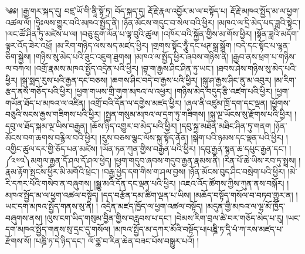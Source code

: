 ༄༅། །རྒྱ་གར་སྐད་དུ། བཛྲ་ཡོ་གི་ནཱི་སྟོ་ཏྲ། བོད་སྐད་དུ། རྡོ་རྗེ་རྣལ་འབྱོར་མ་ལ་བསྟོད་པ། རྡོ་རྗེ་མཁའ་སྤྱོད་མ་ལ་ཕྱག་འཚལ་ལོ། །ཧྲཱིཿལས་གྱུར་བའི་མཁའ་སྤྱོད་ནི། །ཉོན་མོངས་གདུང་བ་སེལ་བའི་ཕྱིར། །མཁའ་ལ་དྲི་མེད་པད་ཟླའི་སྟེང་། །ལང་ཚོ་ཤིན་ཏུ་མཛེས་པ་ལ། །བཅུ་དྲུག་ལོན་པ་ལྟ་བུའི་ཚུལ། །འཁོར་བའི་སྐྱོན་གྱིས་མ་གོས་ཕྱིར། །སྟོན་ཟླའི་མདོག་ལྟར་འོད་ཟེར་འཕྲོ། །མ་རིག་གཉིད་ལས་སད་མཛད་ཕྱིར། །གྲགས་སྟོང་ཧཱུྃ་དང་ཕཊ་སྒྲ་སྒྲོག །བདེ་དང་སྟོང་པ་ལྷན་ཅིག་སྐྱེས། །གཉིས་སུ་མེད་པའི་ཟུང་འཇུག་ཐུགས། །མཁའ་ལ་སྤྱོད་ཕྱིར་ཞབས་གཉིས་ནི། །རྒྱབ་ནས་ཕྲག་པ་གཉིས་ལ་བཀལ། །འགྲོ་རྣམས་མཁའ་སྤྱོད་འདྲེན་པའི་ཕྱིར། །བྷ་ག་རྒྱས་ཤིང་ཤིན་ཏུ་ཡང་། །ཐབས་ཤེས་གཉིས་སུ་མེད་པའི་ཕྱིར། །སྐུ་སྨད་རུས་པའི་རྒྱན་དང་བཅས། །ཆགས་ཤིང་བདེ་བ་རྒྱས་པའི་ཕྱིར། །སྐུ་ཤ་རྒྱས་ཤིང་ནུ་མ་འབུར། །མ་རིག་རྩད་ནས་གཅོད་པའི་ཕྱིར། །ཕྱག་གཡས་གྲི་གུག་མཁའ་ལ་འཕྱར། །གཉིས་མེད་བདུད་རྩི་འཛག་པའི་ཕྱིར། །ཕྱག་གཡོན་ཐོད་པ་མཁའ་ལ་འཛིན། །འགྲོ་བའི་དོན་ལ་དགྱེས་མཛད་ཕྱིར། །ཞལ་ནི་འཛུམ་ཁྲོ་དག་དང་ལྡན། །ཕྱོགས་བཅུའི་སངས་རྒྱས་གཟིགས་པའི་ཕྱིར། །སྤྱན་གསུམ་མཁའ་ལ་དྲག་ཏུ་གཟིགས། །སྐུ་ལྔ་ཡོངས་སུ་རྫོགས་པའི་ཕྱིར། །དབུ་ལ་ཐོད་སྐམ་ལྔ་ཡིས་བརྒྱན། །ཆོས་ཉིད་འགྱུར་བ་མེད་པའི་ཕྱིར། །དབུ་སྐྲ་མཐོན་མཐིང་ཤིན་ཏུ་གནག །ཉོན་མོངས་བག་ཆགས་བརྙིལ་བའི་ཕྱིར། །རུས་བཅས་ལྕང་ལོས་སྐུ་སྟོད་ནོན། །སྒེག་པའི་ཉམས་དང་ལྡན་པའི་ཕྱིར། །འགྱིང་ཚུལ་དར་གྱི་ཅོད་པན་མཛེས། །ཡོན་ཏན་ཀུན་གྱིས་བརྒྱན་པའི་ཕྱིར། །དབུ་རྒྱན་སྙན་ཆ་དཔུང་རྒྱན་དང་། །༼༢༧༢༽མགུལ་རྒྱན་དོ་ཤལ་དོ་ཤལ་ཕྱེད། །ཕྱག་གདུབ་ཞབས་གདུབ་རྒྱན་རྣམས་ནི། །རིན་པོ་ཆེ་ཡིས་རབ་ཏུ་སྤྲས། །རྣམ་རྟོག་སྤངས་ཕྱིར་མི་མགོའི་ཕྲེང་། །བརྒྱ་ཕྱེད་དག་གིས་ག་ཤལ་བྱས། །ཉོན་མོངས་བུད་ཤིང་བསྲེག་པའི་ཕྱིར། །མེ་རི་དཀར་པོའི་གསེབ་ན་བཞུགས། །སྒྱུ་མའི་དོན་དང་ལྡན་པའི་ཕྱིར། །འཇའ་འོད་ཚོགས་ཀྱིས་ཀུན་ནས་བསྐོར། །མཁའ་སྤྱོད་མ་ལ་ཕྱག་འཚལ་བསྟོད། །དད་བརྩོན་དམ་ཚིག་ལྡན་པ་ཡིས། །མཆོད་བསྟོད་གསོལ་བ་བཏབ་གྱུར་ན། །ཡང་དག་མཁའ་སྤྱོད་གནས་སུ་ནི། །
འདྲེན་མཛད་ཁྱོད་ལ་ཕྱག་འཚལ་བསྟོད། །མདུན་གྱི་མཁའ་ལ་ལྷ་མོ་ཁྱོད་བཞུགས་ནས། །ལུས་ངག་ཡིད་གསུམ་བྱིན་གྱིས་བརླབས་པ་དང་། །བེམས་རིག་བྲལ་ཚེ་བར་གཅོད་མེད་པ་རུ། །ཡང་དག་མཁའ་སྤྱོད་གནས་སུ་དྲང་དུ་གསོལ། །མཁའ་སྤྱོད་མ་དཀར་མོའི་བསྟོད་པ།པཎྜི་ཏ་དཱི་པཾ་ཀ་རས་མཛད་པ་རྫོགས་སོ། །པཎྜི་ཏ་དེ་ཉིད་དང་། ལོ་ཙྪ་བ་རིན་ཆེན་བཟང་པོས་བསྒྱུར་པའོ། །